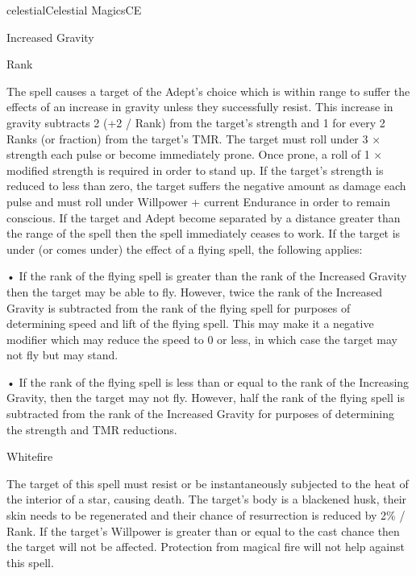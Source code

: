 \begin{College}[1.3]{celestial}{Celestial Magics}{CE}
\begin{spell}[S-8]{Increased Gravity}

Rank 
\begin{effects}
The spell causes a target of the Adept’s choice which is within range
to suffer the effects of an increase in gravity unless they
successfully resist.  This increase in gravity subtracts 2 (+2 / Rank)
from the target’s strength and 1 for every 2 Ranks (or fraction) from
the target’s TMR.  The target must roll under 3 × strength each pulse
or become immediately prone. Once prone, a roll of 1 × modified
strength is required in order to stand up.  If the target’s strength
is reduced to less than zero, the target suffers the negative amount
as damage each pulse and must roll under Willpower + current Endurance
in order to remain conscious.  If the target and Adept become
separated by a distance greater than the range of the spell then the
spell immediately ceases to work.  If the target is under (or comes
under) the effect of a flying spell, the following applies:

• If the rank of the flying spell is greater than the rank of the
Increased Gravity then the target may be able to fly.  However, twice
the rank of the Increased Gravity is subtracted from the rank of the
flying spell for purposes of determining speed and lift of the flying
spell. This may make it a negative modifier which may reduce the speed
to 0 or less, in which case the target may not fly but may stand.

• If the rank of the flying spell is less than or equal to the rank of
the Increasing Gravity, then the target may not fly.  However, half
the rank of the flying spell is subtracted from the rank of the
Increased Gravity for purposes of determining the strength and TMR
reductions.
\end{effects}
\end{spell}

\begin{spell}[S-9]{Whitefire}

\begin{effects}
The target of this spell must resist or be instantaneously subjected
to the heat of the interior of a star, causing death.  The target’s
body is a blackened husk, their skin needs to be regenerated and their
chance of resurrection is reduced by 2\% / Rank.  If the target’s
Willpower is greater than or equal to the cast chance then the target
will not be affected. Protection from magical fire will not help
against this spell.
\end{effects}
\end{spell}


\end{College}
